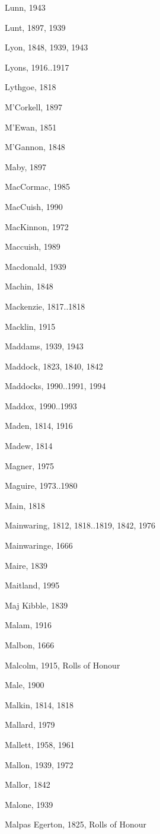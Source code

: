 \begin{theindex}
\item Lunn, 1943
\item Lunt, 1897, 1939
\item Lyon, 1848, 1939, 1943
\item Lyons, 1916..1917
\item Lythgoe, 1818
\item M'Corkell, 1897
\item M'Ewan, 1851
\item M'Gannon, 1848
\item Maby, 1897
\item MacCormac, 1985
\item MacCuish, 1990
\item MacKinnon, 1972
\item Maccuish, 1989
\item Macdonald, 1939
\item Machin, 1848
\item Mackenzie, 1817..1818
\item Macklin, 1915
\item Maddams, 1939, 1943
\item Maddock, 1823, 1840, 1842
\item Maddocks, 1990..1991, 1994
\item Maddox, 1990..1993
\item Maden, 1814, 1916
\item Madew, 1814
\item Magner, 1975
\item Maguire, 1973..1980
\item Main, 1818
\item Mainwaring, 1812, 1818..1819, 1842, 1976
\item Mainwaringe, 1666
\item Maire, 1839
\item Maitland, 1995
\item Maj Kibble, 1839
\item Malam, 1916
\item Malbon, 1666
\item Malcolm, 1915, Rolls of Honour
\item Male, 1900
\item Malkin, 1814, 1818
\item Mallard, 1979
\item Mallett, 1958, 1961
\item Mallon, 1939, 1972
\item Mallor, 1842
\item Malone, 1939
\item Malpas Egerton, 1825, Rolls of Honour

\end{theindex}
